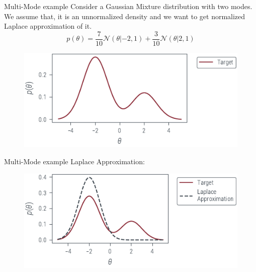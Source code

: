 \documentclass{beamer}
\begin{document}
\begin{frame}{Multi-Mode example}
    Consider a Gaussian Mixture distribution with two modes. We assume that, it is an unnormalized density and we want to get normalized Laplace approximation of it.
    \pause
    \begin{equation*}
        p(\theta) = \frac{7}{10}\mathcal{N}(\theta|-2, 1) + \frac{3}{10}\mathcal{N}(\theta|2, 1)
    \end{equation*}
    \pause
    \begin{figure}
        \includegraphics[]{../figures/laplace-approx/mixture-density.pdf}
    \end{figure}

\end{frame}

\begin{frame}{Multi-Mode example}
    Laplace Approximation:
    \begin{figure}
        \includegraphics[]{../figures/laplace-approx/mixture-density-laplace.pdf}
    \end{figure}
\end{frame}
\end{document}
